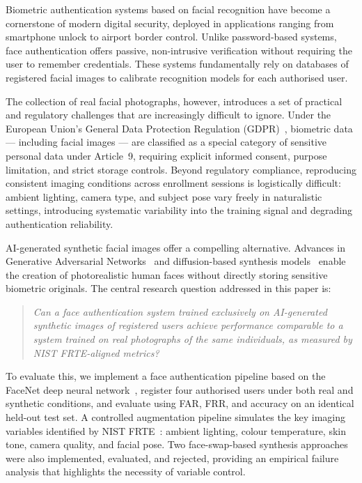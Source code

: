 \documentclass[conference]{IEEEtran}
\begin{document}
Biometric authentication systems based on facial recognition have become a cornerstone of modern digital security, deployed in applications ranging from smartphone unlock to airport border control. Unlike password-based systems, face authentication offers passive, non-intrusive verification without requiring the user to remember credentials. These systems fundamentally rely on databases of registered facial images to calibrate recognition models for each authorised user.

The collection of real facial photographs, however, introduces a set of practical and regulatory challenges that are increasingly difficult to ignore. Under the European Union's General Data Protection Regulation (GDPR)~\cite{gdpr2016}, biometric data — including facial images — are classified as a special category of sensitive personal data under Article~9, requiring explicit informed consent, purpose limitation, and strict storage controls. Beyond regulatory compliance, reproducing consistent imaging conditions across enrollment sessions is logistically difficult: ambient lighting, camera type, and subject pose vary freely in naturalistic settings, introducing systematic variability into the training signal and degrading authentication reliability.

AI-generated synthetic facial images offer a compelling alternative. Advances in Generative Adversarial Networks~\cite{goodfellow2014gan} and diffusion-based synthesis models~\cite{rombach2022diffusion} enable the creation of photorealistic human faces without directly storing sensitive biometric originals. The central research question addressed in this paper is:

\begin{quote}
\textit{Can a face authentication system trained exclusively on AI-generated synthetic images of registered users achieve performance comparable to a system trained on real photographs of the same individuals, as measured by NIST FRTE-aligned metrics?}
\end{quote}

To evaluate this, we implement a face authentication pipeline based on the FaceNet deep neural network~\cite{schroff2015facenet}, register four authorised users under both real and synthetic conditions, and evaluate using FAR, FRR, and accuracy on an identical held-out test set. A controlled augmentation pipeline simulates the key imaging variables identified by NIST FRTE~\cite{nist_frte}: ambient lighting, colour temperature, skin tone, camera quality, and facial pose. Two face-swap-based synthesis approaches were also implemented, evaluated, and rejected, providing an empirical failure analysis that highlights the necessity of variable control.
\end{document}
